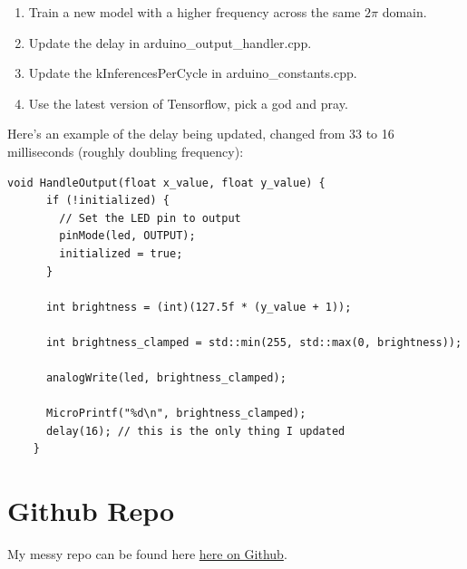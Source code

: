 \documentclass{article}
\begin{document}
    \begin{enumerate}
        \item Train a new model with a higher frequency across the same $2\pi$ domain.
        \item Update the delay in arduino\_output\_handler.cpp.
        \item Update the kInferencesPerCycle in arduino\_constants.cpp.
        \item Use the latest version of Tensorflow, pick a god and pray.
    \end{enumerate}

    Here's an example of the delay being updated, changed from 33 to 16 milliseconds (roughly doubling frequency):

    \begin{lstlisting}[label={lst:delay}]
    void HandleOutput(float x_value, float y_value) {
      if (!initialized) {
        // Set the LED pin to output
        pinMode(led, OUTPUT);
        initialized = true;
      }

      int brightness = (int)(127.5f * (y_value + 1));

      int brightness_clamped = std::min(255, std::max(0, brightness));

      analogWrite(led, brightness_clamped);

      MicroPrintf("%d\n", brightness_clamped);
      delay(16); // this is the only thing I updated
    }
    \end{lstlisting}

    \section{Github Repo}\label{sec:deliverables}
    My messy repo can be found here \href{https://github.com/crimsonmagick/cosc592\_arduino1.git}{here on Github}.

    
    
\end{document}
